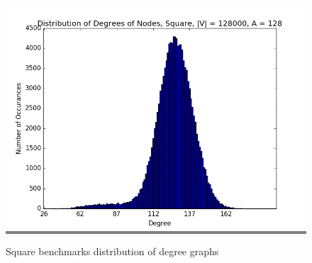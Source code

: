 \documentclass{article}
\begin{document}
\begin{figure}
\begin{minipage}{0.3\textwidth}
    \colorbox{gray}{\includegraphics[width=\linewidth]{./graphs/hist_deg_square_6.png}}
    \end{minipage}
    \hspace{\fill}

    \caption{Square benchmarks distribution of degree graphs}
    \label{squaredeghists}
\end{figure}
\end{document}
